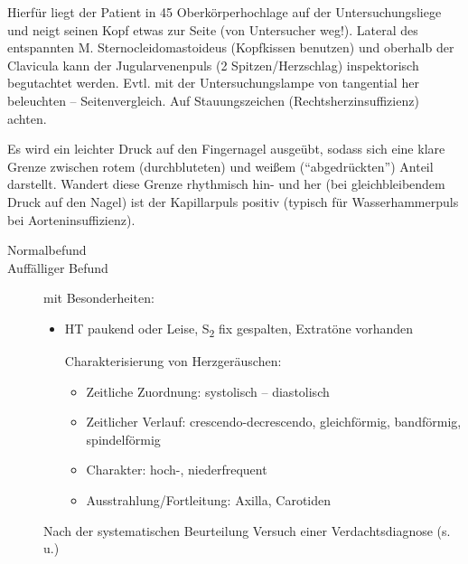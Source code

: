 {Hierfür liegt der Patient in 45{\textdegree}
Oberkörperhochlage auf der Untersuchungsliege und neigt seinen Kopf
etwas zur Seite (von Untersucher weg!). Lateral des entspannten
M. Sternocleidomastoideus
(Kopfkissen benutzen) und oberhalb der Clavicula kann der
Jugularvenenpuls (2 Spitzen/Herzschlag) inspektorisch begutachtet
werden. Evtl. mit der Untersuchungslampe von tangential her beleuchten
-- Seitenvergleich. Auf Stauungszeichen (Rechtsherzinsuffizienz)
achten.
}{\MoveDown}{}{}{}

{Es wird ein leichter Druck auf den Fingernagel ausgeübt,
sodass sich eine klare Grenze zwischen rotem
(durchbluteten) und weißem (\enquote{abgedrückten}) Anteil
darstellt. Wandert diese Grenze rhythmisch hin- und her
(bei gleichbleibendem Druck auf den Nagel) ist der
Kapillarpuls positiv (typisch für Wasserhammerpuls bei Aorteninsuffizienz).
}
{\MoveDown}
{}
{}
{}




{
\begin{description}
  \item[Normalbefund]
  \item[Auffälliger Befund] mit
  Besonderheiten:
  \begin{itemize}
    \item HT paukend oder Leise, S\textsubscript{2} fix
    gespalten, Extratöne vorhanden 
    
    Charakterisierung von Herzgeräuschen:
    \begin{itemize}
      \item Zeitliche Zuordnung: systolisch -- diastolisch
      \item Zeitlicher Verlauf: crescendo-decrescendo,
      gleichförmig, bandförmig, spindelförmig
      \item Charakter: hoch-, niederfrequent
      \item Ausstrahlung/Fortleitung: Axilla, Carotiden
    \end{itemize}
  \end{itemize}
  Nach der systematischen Beurteilung Versuch einer
  Verdachtsdiagnose (s.\,u.)
\end{description}
}
{
\begin{PkuBefunde}[]
  \item[\SymbolPkuNormal] 
  \item[\SymbolPkuVariante] 
  \item[\SymbolPkuPathologisch] 
\end{PkuBefunde}
}
{}
{}
{}


